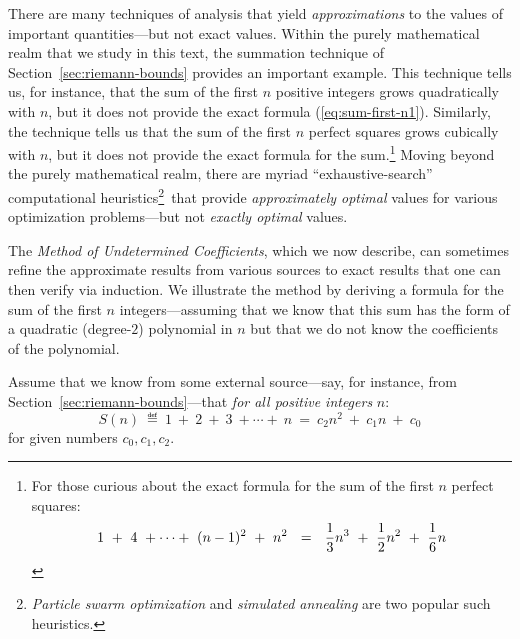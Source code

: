 There are many techniques of analysis that yield {\em approximations} to the values of important quantities---but not exact values.  Within the purely mathematical realm that we study in this text, the summation technique of Section~\ref{sec:riemann-bounds} provides an important example.  This technique tells us, for instance, that the sum of the first $n$ positive integers grows quadratically with $n$, but it does not provide the exact formula (\ref{eq:sum-first-n1}).   Similarly, the technique tells us that the sum of the first $n$ perfect squares grows cubically with $n$, but it does not provide the exact formula for the sum.\footnote{For those curious about the exact formula for the sum of the first $n$ perfect squares:
\begin{equation}
\label{eq:sum-1-to-nsq1}
1 \ + \ 4 \ + \cdots + \ (n-1)^2 \ + \ n^2 
 \ \ = \ \
{1 \over 3} n^3 \ + \ {1 \over 2} n^2 \ + \ {1 \over 6} n
\end{equation}}
Moving beyond the purely mathematical realm, there are myriad ``exhaustive-search'' computational heuristics\footnote{{\it Particle swarm optimization} \cite{KennedyE95} and {\it simulated annealing} \cite{KirkpatrickGV83} are two popular such heuristics.}~that provide {\em approximately optimal} values for various optimization problems---but not {\em exactly optimal} values.

\medskip

The {\em Method of Undetermined Coefficients}, which we now describe, can sometimes refine the approximate results from various sources to exact results that one can then verify via induction.  We illustrate the method by deriving a formula for the sum of the first $n$ integers---assuming that we know that this sum has the form of a quadratic (degree-$2$) polynomial in $n$ but that we do not know the coefficients of the polynomial.

\smallskip

Assume that we know from some external source---say, for instance, from Section~\ref{sec:riemann-bounds}---that {\em for all positive integers} $n$:
\begin{equation}
\label{eq:formula-for-n}
S(n) \ \eqdef \
 1 \ + \ 2 \ + \ 3 \ + \cdots + \ n 
 \ = \ 
c_2 n^2 \ + \ c_1 n \ + \ c_0
\end{equation}
for given numbers $c_0, c_1, c_2$.

\smallskip

